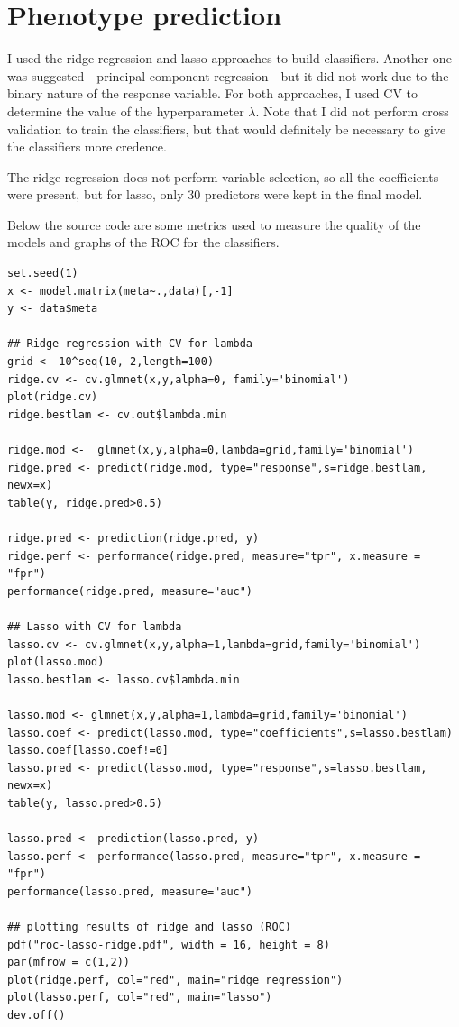 \documentclass[11pt, a4paper]{article}
\begin{document}
\section{Phenotype prediction}
\label{sec-4}


I used the ridge regression and lasso approaches to build
classifiers. Another one was suggested - principal component
regression - but it did not work due to the binary nature of the
response variable. For both approaches, I used CV to determine the
value of the hyperparameter $\lambda$. Note that I did not perform
cross validation to train the classifiers, but that would definitely
be necessary to give the classifiers more credence.

The ridge regression does not perform variable selection, so all the
coefficients were present, but for lasso, only 30 predictors were kept
in the final model.

Below the source code are some metrics used to measure the quality of
the models and graphs of the ROC for the classifiers.


\begin{verbatim}
set.seed(1)
x <- model.matrix(meta~.,data)[,-1]
y <- data$meta

## Ridge regression with CV for lambda
grid <- 10^seq(10,-2,length=100)
ridge.cv <- cv.glmnet(x,y,alpha=0, family='binomial')
plot(ridge.cv)
ridge.bestlam <- cv.out$lambda.min

ridge.mod <-  glmnet(x,y,alpha=0,lambda=grid,family='binomial')
ridge.pred <- predict(ridge.mod, type="response",s=ridge.bestlam, newx=x)
table(y, ridge.pred>0.5)

ridge.pred <- prediction(ridge.pred, y)
ridge.perf <- performance(ridge.pred, measure="tpr", x.measure = "fpr")
performance(ridge.pred, measure="auc")

## Lasso with CV for lambda
lasso.cv <- cv.glmnet(x,y,alpha=1,lambda=grid,family='binomial')
plot(lasso.mod)
lasso.bestlam <- lasso.cv$lambda.min

lasso.mod <- glmnet(x,y,alpha=1,lambda=grid,family='binomial')
lasso.coef <- predict(lasso.mod, type="coefficients",s=lasso.bestlam)
lasso.coef[lasso.coef!=0]
lasso.pred <- predict(lasso.mod, type="response",s=lasso.bestlam, newx=x)
table(y, lasso.pred>0.5)

lasso.pred <- prediction(lasso.pred, y)
lasso.perf <- performance(lasso.pred, measure="tpr", x.measure = "fpr")
performance(lasso.pred, measure="auc")

## plotting results of ridge and lasso (ROC)
pdf("roc-lasso-ridge.pdf", width = 16, height = 8)
par(mfrow = c(1,2))
plot(ridge.perf, col="red", main="ridge regression")
plot(lasso.perf, col="red", main="lasso")
dev.off()
\end{verbatim}
\end{document}
